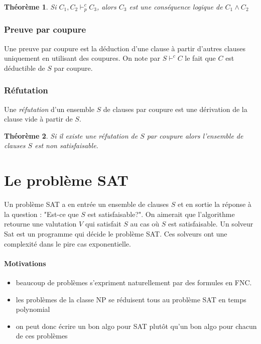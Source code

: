 \documentclass[a4paper]{article}
\newtheorem{theorem}{Théorème}[section]
\begin{document}
  \begin{theorem}
  Si $C_1, C_2 \vdash^c_p C_3$, alors $C_3$ est une conséquence logique de $C_1 \land C_2$
  \end{theorem}

  \subsubsection{Preuve par coupure}
  Une preuve par coupure est la déduction d'une clause à partir d'autres clauses uniquement
  en utilisant des coupures. On note par $S \vdash^c C$ le fait que $C$ est déductible de $S$ par coupure.

  \subsubsection{Réfutation}
  Une \textit{réfutation} d'un ensemble $S$ de clauses par coupure est une dérivation
  de la clause vide à partir de $S$.

  \begin{theorem}
  Si il existe une réfutation de $S$ par coupure alors l'ensemble de clauses $S$
  est non satisfaisable.
  \end{theorem}


\section{Le problème SAT}

  Un problème SAT a en entrée un ensemble de clauses $S$ et en sortie la réponse à 
  la question : "Est-ce que $S$ est satisfaisable?". On aimerait que l'algorithme
  retourne une valutation $V$ qui satisfait $S$ au cas où $S$ est satisfaisable.
  Un solveur Sat est un programme qui décide le  problème SAT. Ces solveurs
  ont une complexité dans le pire cas exponentielle.

  \paragraph{Motivations}
  \begin{itemize}
    \item beaucoup de problèmes s'expriment naturellement par des formules en FNC.
    \item les problèmes de la classe NP se réduisent tous au problème SAT en temps polynomial
    \item on peut donc écrire un bon algo pour SAT plutôt qu'un bon algo pour chacun de ces problèmes
  \end{itemize}
\end{document}
